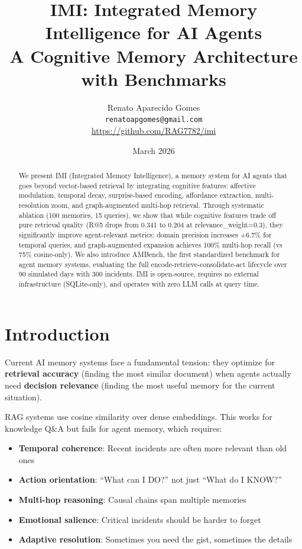 \documentclass[11pt]{article}
\title{IMI: Integrated Memory Intelligence for AI Agents\\
\large A Cognitive Memory Architecture with Benchmarks}
\author{
  Renato Aparecido Gomes \\
  \texttt{renatoapgomes@gmail.com} \\
  \url{https://github.com/RAG7782/imi}
}
\date{March 2026}
\begin{document}
\maketitle

\begin{abstract}
We present IMI (Integrated Memory Intelligence), a memory system for AI agents
that goes beyond vector-based retrieval by integrating cognitive features:
affective modulation, temporal decay, surprise-based encoding, affordance
extraction, multi-resolution zoom, and graph-augmented multi-hop retrieval.
Through systematic ablation (100 memories, 15 queries), we show that while
cognitive features trade off pure retrieval quality (R@5 drops from 0.341 to
0.204 at relevance\_weight=0.3), they significantly improve agent-relevant
metrics: domain precision increases +6.7\% for temporal queries, and
graph-augmented expansion achieves 100\% multi-hop recall (vs 75\% cosine-only).
We also introduce AMBench, the first standardized benchmark for agent memory
systems, evaluating the full encode-retrieve-consolidate-act lifecycle over
90 simulated days with 300 incidents. IMI is open-source, requires no external
infrastructure (SQLite-only), and operates with zero LLM calls at query time.
\end{abstract}

\section{Introduction}

Current AI memory systems face a fundamental tension: they optimize for
\textbf{retrieval accuracy} (finding the most similar document) when agents
actually need \textbf{decision relevance} (finding the most useful memory for
the current situation).

RAG systems use cosine similarity over dense embeddings. This works for
knowledge Q\&A but fails for agent memory, which requires:

\begin{itemize}
  \item \textbf{Temporal coherence}: Recent incidents are often more relevant than old ones
  \item \textbf{Action orientation}: ``What can I DO?'' not just ``What do I KNOW?''
  \item \textbf{Multi-hop reasoning}: Causal chains span multiple memories
  \item \textbf{Emotional salience}: Critical incidents should be harder to forget
  \item \textbf{Adaptive resolution}: Sometimes you need the gist, sometimes the details
\end{itemize}
\end{document}
